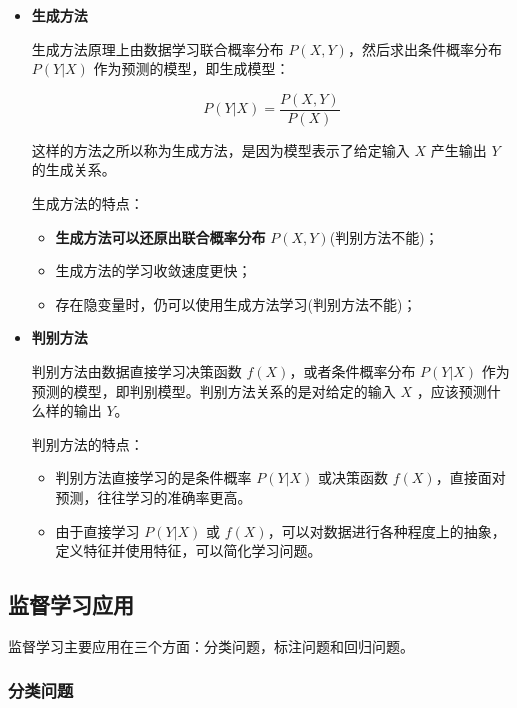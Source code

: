 \begin{itemize}
    \item \textbf{生成方法}
    
    生成方法原理上由数据学习联合概率分布 $P(X,Y)$，然后求出条件概率分布 $P(Y|X)$ 作为预测的模型，即生成模型：

    \begin{equation}
        P(Y|X) = \frac{P(X,Y)}{P(X)}
    \end{equation}

    这样的方法之所以称为生成方法，是因为模型表示了给定输入 $X$ 产生输出 $Y$ 的生成关系。

    生成方法的特点：
    \begin{itemize}[itemindent=1em]
        \item \textbf{生成方法可以还原出联合概率分布} $P(X,Y)$(判别方法不能)；
        \item 生成方法的学习收敛速度更快；
        \item 存在隐变量时，仍可以使用生成方法学习(判别方法不能)；
    \end{itemize}

    

    \item \textbf{判别方法}

    判别方法由数据直接学习决策函数 $f(X)$，或者条件概率分布 $P(Y|X)$ 作为预测的模型，即判别模型。判别方法关系的是对给定的输入 $X$ ，应该预测什么样的输出 $Y$。

    判别方法的特点：
    \begin{itemize}[itemindent=1em]
        \item 判别方法直接学习的是条件概率 $P(Y|X)$ 或决策函数 $f(X)$，直接面对预测，往往学习的准确率更高。
        \item 由于直接学习 $P(Y|X)$ 或 $f(X)$，可以对数据进行各种程度上的抽象，定义特征并使用特征，可以简化学习问题。
    \end{itemize}
\end{itemize}

\subsection{监督学习应用}

监督学习主要应用在三个方面：分类问题，标注问题和回归问题。

\subsubsection{分类问题}

